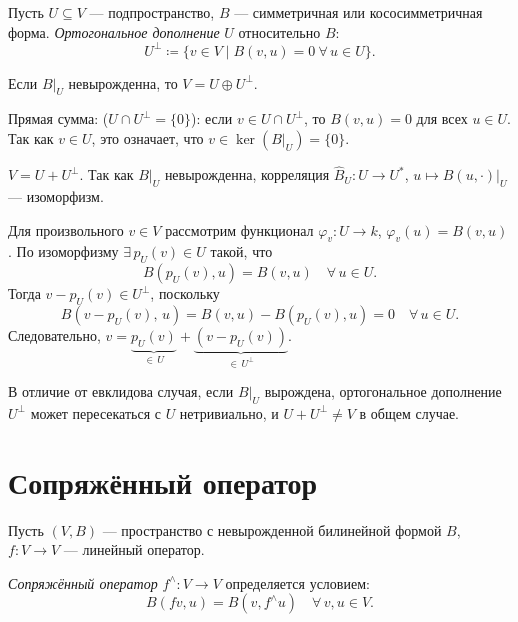 \begin{definition}
    Пусть $U \subseteq V$ --- подпространство, $B$ --- симметричная или кососимметричная форма. \emph{Ортогональное дополнение}
    $U$ относительно $B$:
    \[
        U^\perp \coloneqq \{v \in V \mid B(v, u) = 0\ \forall\, u \in U\}.
    \]
\end{definition}

\begin{theorem}
    Если $B\big|_U$ невырожденна, то $V = U \oplus U^\perp$.
    \begin{proofsteps}
        \item Прямая сумма: ($U \cap U^\perp = \{0\}$): если $v \in U \cap U^\perp$, то $B(v, u) = 0$ для всех
        $u \in U$. Так как $v \in U$, это означает, что $v \in \ker(B\big|_U) = \{0\}$.

        \item $V = U + U^\perp$. Так как $B\big|_U$ невырожденна, корреляция $\hat{B}_U\colon U \to U^*$,
        $u \mapsto B(u, \cdot)\big|_U$ --- изоморфизм.

        Для произвольного $v \in V$ рассмотрим функционал $\varphi_v\colon U \to k$, $\varphi_v(u) = B(v, u)$.
        По изоморфизму $\exists\, p_U(v) \in U$ такой, что
        \[
            B(p_U(v), u) = B(v, u) \quad \forall\, u \in U.
        \]
        Тогда $v - p_U(v) \in U^\perp$, поскольку
        \[
            B(v - p_U(v),\, u) = B(v, u) - B(p_U(v), u) = 0 \quad \forall\, u \in U.
        \]
        Следовательно, $v = \underbrace{p_U(v)}_{\in\, U} + \underbrace{(v - p_U(v))}_{\in\, U^\perp}$.
    \end{proofsteps}
\end{theorem}


\begin{remark}
    В отличие от евклидова случая, если $B\big|_U$ вырождена, ортогональное дополнение $U^\perp$ может пересекаться с
    $U$ нетривиально, и $U + U^\perp \neq V$ в общем случае.
\end{remark}


\section{Сопряжённый оператор}

\begin{definition}
    Пусть $(V, B)$ --- пространство с невырожденной билинейной формой $B$, $f\colon V \to V$ --- линейный оператор.

    \emph{Сопряжённый оператор} $f^{\wedge}\colon V \to V$ определяется условием:
    \[
        B(f v, u) = B(v, f^{\wedge} u) \quad \forall\, v, u \in V.
    \]
\end{definition}

